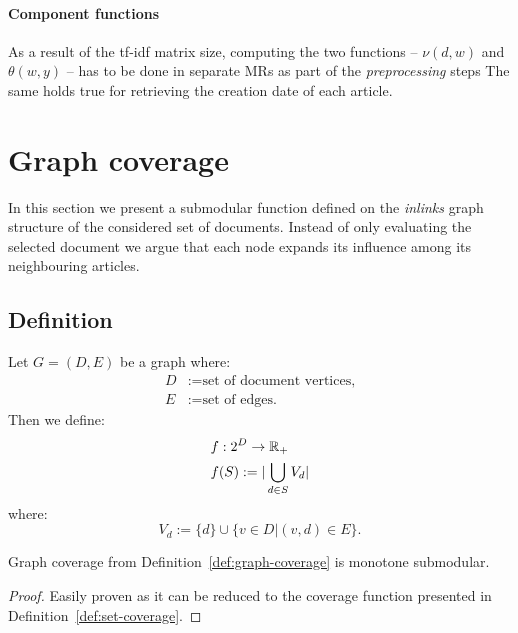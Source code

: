 \paragraph{Component functions}
As a result of the tf-idf matrix size, computing the two functions -- \(\nu(d,
w)\) and \(\theta(w, y)\) -- has to be done in separate \aclp{MR} as part of
the \emph{preprocessing} steps The same holds true for retrieving the creation
date of each article.

\section{Graph coverage}
\label{sec:graph-coverage}

In this section we present a submodular function defined on the \emph{inlinks}
graph structure of the considered set of documents. Instead of only evaluating
the selected document we argue that each node expands its influence among its
neighbouring articles.

\subsection{Definition}

\begin{definition}
  \label{def:graph-coverage}
  Let \(G = (D, E)\) be a graph where:
  \begin{align*}
    D &:= \text{set of document vertices,} \\
    E &:= \text{set of edges.}
  \end{align*}
  Then we define:
  \begin{align*}
    &f : 2^D \to \mathbb{R}_+ \\
    &f(S) := |\bigcup_{d \in S} V_d|
  \end{align*}
  where:
    \[V_d := \{d\} \cup \{v \in D | (v, d) \in E\} \text{.}\]
\end{definition}

\begin{proposition}
  \label{prop:graph-coverage}
  Graph coverage from Definition~\ref{def:graph-coverage} is monotone
  submodular.
  \begin{proof}
    Easily proven as it can be reduced to the coverage function presented in
    Definition~\vref{def:set-coverage}.
  \end{proof}
\end{proposition}

